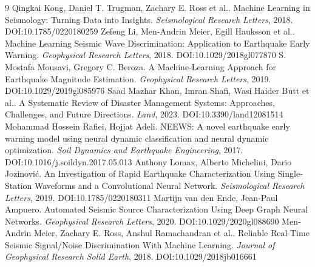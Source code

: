 \documentclass[11pt]{article}
\begin{document}
\begin{thebibliography}{9}
 Qingkai Kong, Daniel T. Trugman, Zachary E. Ross et al.. Machine Learning in Seismology: Turning Data into Insights. \emph{Seismological Research Letters}, 2018. DOI:10.1785/0220180259
 Zefeng Li, Men‐Andrin Meier, Egill Hauksson et al.. Machine Learning Seismic Wave Discrimination: Application to Earthquake Early Warning. \emph{Geophysical Research Letters}, 2018. DOI:10.1029/2018gl077870
 S. Mostafa Mousavi, Gregory C. Beroza. A Machine‐Learning Approach for Earthquake Magnitude Estimation. \emph{Geophysical Research Letters}, 2019. DOI:10.1029/2019gl085976
 Saad Mazhar Khan, Imran Shafi, Wasi Haider Butt et al.. A Systematic Review of Disaster Management Systems: Approaches, Challenges, and Future Directions. \emph{Land}, 2023. DOI:10.3390/land12081514
 Mohammad Hossein Rafiei, Hojjat Adeli. NEEWS: A novel earthquake early warning model using neural dynamic classification and neural dynamic optimization. \emph{Soil Dynamics and Earthquake Engineering}, 2017. DOI:10.1016/j.soildyn.2017.05.013
 Anthony Lomax, Alberto Michelini, Dario Jozinović. An Investigation of Rapid Earthquake Characterization Using Single‐Station Waveforms and a Convolutional Neural Network. \emph{Seismological Research Letters}, 2019. DOI:10.1785/0220180311
 Martijn van den Ende, Jean‐Paul Ampuero. Automated Seismic Source Characterization Using Deep Graph Neural Networks. \emph{Geophysical Research Letters}, 2020. DOI:10.1029/2020gl088690
 Men‐Andrin Meier, Zachary E. Ross, Anshul Ramachandran et al.. Reliable Real‐Time Seismic Signal/Noise Discrimination With Machine Learning. \emph{Journal of Geophysical Research Solid Earth}, 2018. DOI:10.1029/2018jb016661
\end{thebibliography}
\end{document}
